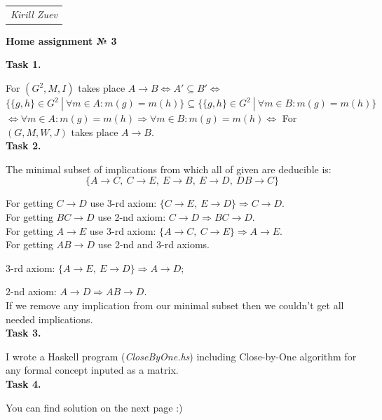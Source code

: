 \documentclass{article}
\begin{document}
\null\hfill\begin{tabular}[t]{l@{}}
	\textit{Kirill Zuev}
\end{tabular}

\begin{center}
	\textbf{Home assignment № 3}
\end{center}

\textbf{Task 1.}

For $(G^2, M, I)$ takes place $A \to B \iff A' \subseteq B' \iff$
$$
\{\{g,h\} \in G^2~|~\forall m \in A: m(g)= m(h)\} \subseteq \{\{g,h\} \in G^2~|~\forall m \in B: m(g)= m(h)\}
$$
$\iff \forall m \in A: m(g)= m(h) \Rightarrow \forall m \in B: m(g)= m(h) \iff$ For $(G, M, W, J)$ takes place $A \to B$.\\

\textbf{Task 2.}

The minimal subset of implications from which all of given are deducible is:
$$
\{ A \to C,\ C \to E,\ E \to B,\ E \to D,\ DB \to C \}
$$

For getting $C \to D$ use 3-rd axiom: $\{ C \to E,\ E \to D \} \Rightarrow C \to D$.\\

For getting $BC \to D$ use 2-nd axiom: $C \to D \Rightarrow BC \to D$.\\

For getting $A \to E$ use 3-rd axiom: $\{ A \to C,\ C \to E \} \Rightarrow A \to E$.\\

For getting $AB \to D$ use 2-nd and 3-rd axioms.

3-rd axiom: $\{ A \to E,\ E \to D \} \Rightarrow A \to D$;

2-nd axiom: $A \to D \Rightarrow AB \to D$.\\

If we remove any implication from our minimal subset then we couldn't get all needed implications.\\

\textbf{Task 3.}

I wrote a Haskell program (\textit{CloseByOne.hs}) including Close-by-One algorithm for any formal concept inputed as a matrix.\\

\textbf{Task 4.}

You can find solution on the next page :)
\end{document}
